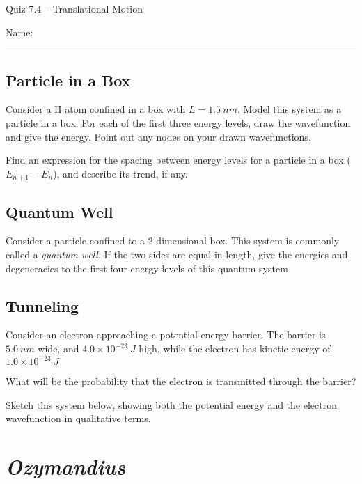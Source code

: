 \documentclass[11pt, letterpaper]{memoir}
\begin{document}
\begin{center}
	{\large Quiz 7.4 --	Translational Motion}
\end{center}
{\large Name: \rule[-1mm]{4in}{.1pt}

\subsection*{Particle in a Box}
Consider a H atom confined in a box with $L=1.5~nm$. Model this system as a particle in a box. For each of the first three energy levels, draw the wavefunction and give the energy. Point out any nodes on your drawn wavefunctions.


\vspace{10em}\noindent
Find an expression for the spacing between energy levels for a particle in a box ($E_{n+1}-E_n$), and describe its trend, if any.

\vspace{6em}
\subsection*{Quantum Well}
Consider a particle confined to a 2-dimensional box. This system is commonly called a \emph{quantum well}. If the two sides are equal in length, give the energies and degeneracies to the first four energy levels of this quantum system

\vspace{20em}
\subsection*{Tunneling}
Consider an electron approaching a potential energy barrier. The barrier is $5.0~nm$ wide, and $4.0\times 10^{-23}~J$ high, while the electron has kinetic energy of $1.0\times 10^{-23}~J$

\noindent What will be the probability that the electron is transmitted through the barrier?

\vspace{15em}\noindent
Sketch this system below, showing both the potential energy and the electron wavefunction in qualitative terms.

\newpage
\pagestyle{empty}
\addtocounter{page}{-1}
\section*{\emph{Ozymandius}}
}
\end{document}

